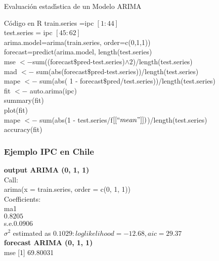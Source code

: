 \documentclass[spanish,xcolor=table]{beamer}
\begin{document}
\begin{section}{Evaluaci\'on estad\'{\i}stica de un Modelo ARIMA}
\begin{frame}
{\begin{exampleblock}{C\'odigo en R}
train.series =ipc $\left [ 1:44 \right ]$\\
test.series = ipc $\left [ 45:62 \right ]$\\
arima.model=arima(train.series, order=c(0,1,1))\\
forecast=predict(arima.model, length(test.series)\\

mse $<-$sum((forecast$\$$pred-test.series)$\wedge2$)/length(test.series)\\
mad $<-$ sum(abs(forecast$\$$pred-test.series))/length(test.series)\\
mape $<-$ sum(abs( 1 - forecast$\$$pred/test.series))/length(test.series)\\

fit $<-$ auto.arima(ipc)\\
summary(fit)\\
plot(fit)\\
mape $<-$ sum(abs(1 - test.series/f$[[``mean"]])$)/length(test.series)\\
accuracy(fit)\\
\end{exampleblock}
}

\end{frame}
\begin{frame}
\frametitle{Ejemplo IPC en Chile}
\textbf{output ARIMA (0, 1, 1) }\\
 \vspace{4mm}	
Call:\\
arima(x = train.series, order = c(0, 1, 1))\\

Coefficients:\\
\hspace{3em}ma1\\
\hspace{2.5em}$0.8205$\\
s.e.\hspace{1em}$ 0.0906$\\

$\sigma^2$ estimated as $0.1029:  log likelihood = -12.68,  aic = 29.37$\\
 \vspace{4mm}
\textbf{forecast ARIMA (0, 1, 1) }\\
mse
[1] 69.80031
\end{frame}


\end{section}
\end{document}

